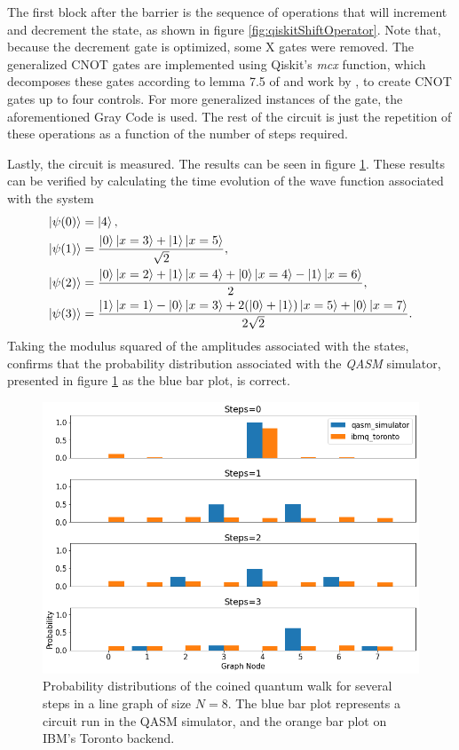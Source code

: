 \documentclass[../../dissertation.tex]{subfiles}
\begin{document}
The first block after the barrier is the sequence of operations that will
increment and decrement the state, as shown in figure
\ref{fig:qiskitShiftOperator}. Note that, because the decrement gate is optimized, some X gates were removed. The generalized CNOT gates are implemented using
Qiskit's \textit{mcx} function, which decomposes these gates according to
lemma 7.5 of \cite{barenco95} and work by \cite{maslov16}, to create CNOT gates up to four controls. For more generalized instances of the gate, the
aforementioned Gray Code is used. The rest
of the circuit is just the repetition of these operations as a function of the
number of steps required.

Lastly, the circuit is measured. The results can be seen in figure
\ref{fig:coinedQWQiskitDist}. These results can be verified by calculating the
time evolution of the wave function associated with the system
\begin{align}
	\ket{\psi(0)} &= \ket{4},\\
	\ket{\psi(1)} &= \frac{\ket{0}\ket{x=3}+\ket{1}\ket{x=5}}{\sqrt{2}}, \\
	\ket{\psi(2)} &= \frac{\ket{0}\ket{x=2}+\ket{1}\ket{x=4}+\ket{0}\ket{x=4}-\ket{1}\ket{x=6}}{2},\\
	\ket{\psi(3)} &= \frac{\ket{1}\ket{x=1}-\ket{0}\ket{x=3}+2(\ket{0}+\ket{1})\ket{x=5}+\ket{0}\ket{x=7}}{2\sqrt{2}}.
\end{align}
Taking the modulus squared of the amplitudes associated with the states,
confirms that the probability distribution associated with the \textit{QASM}
simulator, presented in figure \ref{fig:coinedQWQiskitDist} as the blue bar
plot, is correct. 
\begin{figure}[!h]
	\centering
	\includegraphics[scale=0.40]{img/Qiskit/CoinedQuantumWalk/CoinedQW_N3_S0123.png}
	\caption{Probability distributions of the coined quantum walk for several steps in a line graph of size $N=8$. The blue bar plot represents a circuit run in the QASM simulator, and the orange bar plot on IBM's Toronto backend.} 
	\label{fig:coinedQWQiskitDist}
\end{figure}
\end{document}
